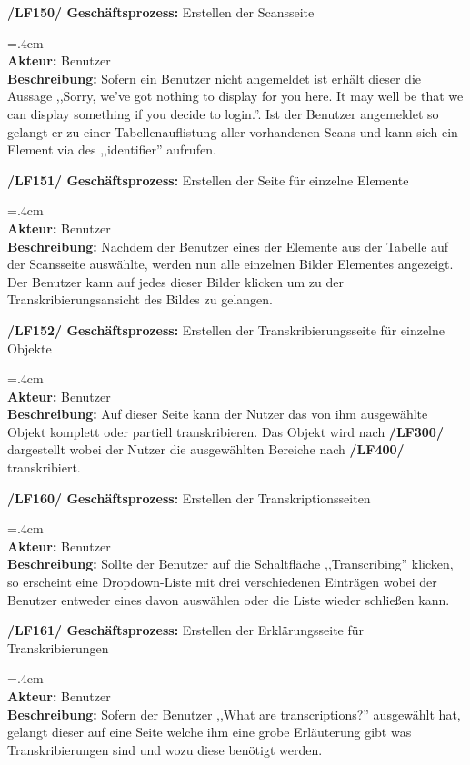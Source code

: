 \documentclass{article}
\newenvironment{funcD}{\vspace{-.6cm}\\\par\begingroup\leftskip=.4cm\noindent\\}{\\\par\endgroup\noindent}
\begin{document}
\textbf{/LF150/ Geschäftsprozess:} Erstellen der Scansseite
\begin{funcD}
    \textbf{Akteur:} Benutzer\vspace{.1cm}\\
    \textbf{Beschreibung:} Sofern ein Benutzer nicht angemeldet ist erhält dieser die Aussage ,,Sorry, we've got nothing to display for you here. It may well be that we can display something if you decide to login.''. Ist der Benutzer angemeldet so gelangt er zu einer Tabellenauflistung aller vorhandenen Scans und kann sich ein Element via des ,,identifier'' aufrufen.
\end{funcD}
\textbf{/LF151/ Geschäftsprozess:} Erstellen der Seite für einzelne Elemente
\begin{funcD}
    \textbf{Akteur:} Benutzer\vspace{.1cm}\\
    \textbf{Beschreibung:} Nachdem der Benutzer eines der Elemente aus der Tabelle auf der Scansseite auswählte, werden nun alle einzelnen Bilder Elementes angezeigt. Der Benutzer kann auf jedes dieser Bilder klicken um zu der Transkribierungsansicht des Bildes zu gelangen. 
\end{funcD}
\textbf{/LF152/ Geschäftsprozess:} Erstellen der Transkribierungsseite für einzelne Objekte
\begin{funcD}
    \textbf{Akteur:} Benutzer\vspace{.1cm}\\
    \textbf{Beschreibung:} Auf dieser Seite kann der Nutzer das von ihm ausgewählte Objekt komplett oder partiell transkribieren. Das Objekt wird nach \textbf{/LF300/} dargestellt wobei der Nutzer die ausgewählten Bereiche nach \textbf{/LF400/} transkribiert.
\end{funcD}
\textbf{/LF160/ Geschäftsprozess:} Erstellen der Transkriptionsseiten
\begin{funcD}
    \textbf{Akteur:} Benutzer\vspace{.1cm}\\
    \textbf{Beschreibung:} Sollte der Benutzer auf die Schaltfläche ,,Transcribing'' klicken, so erscheint eine Dropdown-Liste mit drei verschiedenen Einträgen wobei der Benutzer entweder eines davon auswählen oder die Liste wieder schließen kann. 
\end{funcD}
\textbf{/LF161/ Geschäftsprozess:} Erstellen der Erklärungsseite für Transkribierungen
\begin{funcD}
    \textbf{Akteur:} Benutzer\vspace{.1cm}\\
    \textbf{Beschreibung:} Sofern der Benutzer ,,What are transcriptions?'' ausgewählt hat, gelangt dieser auf eine Seite welche ihm eine grobe Erläuterung gibt was Transkribierungen sind und wozu diese benötigt werden.
\end{funcD}
\end{document}
